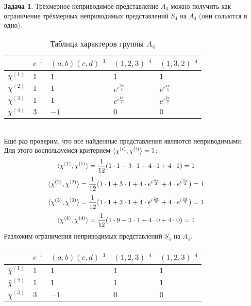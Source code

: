 \documentclass[12pt]{article}
\theoremstyle{definition}
\newtheorem{zad}{Задача}[section]
\begin{document}
\begin{zad}
Трёхмерное неприводимое представление $A_4$ можно получить как ограничение трёхмерных неприводимых представлений $S_4$ на $A_4$ (они сольются в одно).
\begin{table}[h!]
\centering
\begin{tabular}{|l|l|l|l|l|}
\hline
 & $e$ $^1$ & $(a,b)(c,d)$ $^3$ & $(1,2,3)$ $^4$ & $(1,3,2)$ $^4$ \\ \hline
$\chi^{(1)}$ & $1$ & $1$ & $1$ & $1$ \\ \hline
$\chi^{(2)}$ & $1$ & $1$ & $e^{i\frac{2\pi}{3}}$ & $e^{i\frac{4\pi}{3}}$ \\ \hline
$\chi^{(3)}$ & $1$ & $1$ & $e^{i\frac{4\pi}{3}}$ & $e^{i\frac{2\pi}{3}}$ \\ \hline
$\chi^{(4)}$ & $3$ & $-1$ & $0$ & $0$ \\ \hline
\end{tabular}
\caption{Таблица характеров группы $A_4$}
\end{table}\\
Ещё раз проверим, что все найденные представления являются неприводимыми. Для этого воспользуемся критерием $\braket{\chi^{(i)},\chi^{(i)}}=1$:
\begin{equation}
    \braket{\chi^{(1)},\chi^{(1)}}=\frac{1}{12}(1\cdot1+3\cdot1+4\cdot 1+4\cdot 1)=1
\end{equation}
\begin{equation}
    \braket{\chi^{(2)},\chi^{(2)}}=\frac{1}{12}(1\cdot1+3\cdot1+4\cdot e^{i\frac{4\pi}{3}}+4\cdot e^{i\frac{2\pi}{3}})=1
\end{equation}
\begin{equation}
    \braket{\chi^{(3)},\chi^{(3)}}=\frac{1}{12}(1\cdot1+3\cdot1+4\cdot e^{i\frac{2\pi}{3}}+4\cdot e^{i\frac{4\pi}{3}})=1
\end{equation}
\begin{equation}
    \braket{\chi^{(4)},\chi^{(4)}}=\frac{1}{12}(1\cdot9+3\cdot1+4\cdot0+4\cdot0)=1
\end{equation}
Разложим ограничения неприводимых представлений $S_4$ на $A_4$:
\begin{table}[h!]
\centering
\begin{tabular}{|l|l|l|l|l|}
\hline
 & $e$ $^1$ & $(a,b)(c,d)$ $^3$ & $(1,2,3)$ $^4$ & $(1,2,3)$ $^4$ \\ \hline
$\bar{\chi}^{(1)}$ & $1$ & $1$ & $1$ & $1$ \\ \hline
$\bar{\chi}^{(2)}$ & $1$ & $1$ & $1$ & $1$ \\ \hline
$\bar{\chi}^{(3)}$ & $3$ & $-1$ & $0$ & $0$ \\ \hline

\end{tabular}
\end{table}
\end{zad}
\end{document}
